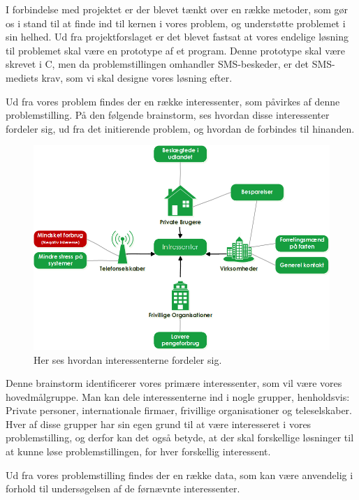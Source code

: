 I forbindelse med projektet er der blevet tænkt over en række metoder, som gør os i stand til at finde ind til kernen i vores problem, og understøtte problemet i sin helhed.
Ud fra projektforslaget er det blevet fastsat at vores endelige løsning til problemet skal være en prototype af et program. Denne prototype skal være skrevet i C, men da problemstillingen omhandler SMS-beskeder, er det  SMS-mediets krav, som vi skal designe vores løsning efter.


Ud fra vores problem findes der en række interessenter, som påvirkes af denne problemstilling.
På den følgende brainstorm, ses hvordan disse interessenter fordeler sig, ud fra det initierende problem, og hvordan de forbindes til hinanden.

\begin{figure}[H]
\includegraphics[width=\linewidth]{Billeder/Brainstormting.png}
\caption{Her ses hvordan interessenterne fordeler sig.}
\end{figure}

Denne brainstorm identificerer vores primære interessenter, som vil være vores hovedmålgruppe.
Man kan dele interessenterne ind i nogle grupper, henholdsvis: Private personer, internationale firmaer, frivillige organisationer og teleselskaber.
Hver af disse grupper har sin egen grund til at være interesseret i vores problemstilling, og derfor kan det også betyde, at der skal forskellige løsninger til at kunne løse problemstillingen, for hver forskellig interessent.


Ud fra vores problemstilling findes der en række data, som kan være anvendelig i forhold til undersøgelsen af de førnævnte interessenter.


